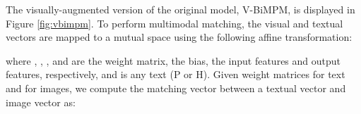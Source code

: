 \documentclass[11pt]{article}
\begin{document}
\noindent
The visually-augmented version of the original model, V-BiMPM, is displayed in Figure \ref{fig:vbimpm}. To perform multimodal matching, the visual and textual vectors are mapped to a mutual space using the following affine transformation:



\noindent 
where , ,  , and  are the weight matrix, the bias, the input features and output features, respectively, and  is any text (P or H). Given weight matrices  for text and  for images, we compute the matching vector  between a textual vector  and image vector  as:







 

\end{document}
